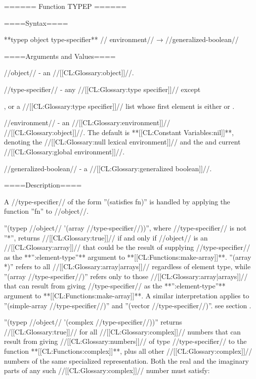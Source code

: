 ====== Function TYPEP ======

====Syntax====

**typep {object type-specifier** //\opt} environment// → //generalized-boolean//

====Arguments and Values====

//object// - an //[[CL:Glossary:object]]//.

//type-specifier// - any //[[CL:Glossary:type specifier]]// except

, or a //[[CL:Glossary:type specifier]]// list whose first element is either  or .

//environment// - an //[[CL:Glossary:environment]]// //[[CL:Glossary:object]]//. The default is **[[CL:Constant Variables:nil]]**, denoting the //[[CL:Glossary:null lexical environment]]// and the and current //[[CL:Glossary:global environment]]//.

//generalized-boolean// - a //[[CL:Glossary:generalized boolean]]//.

====Description====


A //type-specifier// of the form ''(satisfies fn)'' is handled by applying the function ''fn'' to //object//.

''(typep //object// '(array //type-specifier//))'', where //type-specifier// is not ''*'', returns //[[CL:Glossary:true]]// if and only if //object// is an //[[CL:Glossary:array]]// that could be the result of supplying //type-specifier// as the **'':element-type''** argument to **[[CL:Functions:make-array]]**. ''(array *)'' refers to all //[[CL:Glossary:array|arrays]]// regardless of element type, while ''(array //type-specifier//)'' refers only to those //[[CL:Glossary:array|arrays]]// that can result from giving //type-specifier// as the **'':element-type''** argument to **[[CL:Functions:make-array]]**. A similar interpretation applies to ''(simple-array //type-specifier//)'' and ''(vector //type-specifier//)''. see section {\secref\ArrayUpgrading}.

''(typep //object// '(complex //type-specifier//))'' returns //[[CL:Glossary:true]]// for all //[[CL:Glossary:complex]]// numbers that can result from giving //[[CL:Glossary:numbers]]// of type //type-specifier// to the function **[[CL:Functions:complex]]**, plus all other //[[CL:Glossary:complex]]// numbers of the same specialized representation. Both the real and the imaginary parts of any such //[[CL:Glossary:complex]]// number must satisfy:

